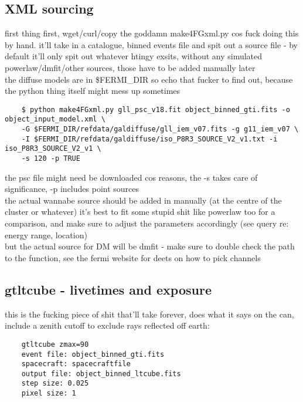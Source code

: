 \documentclass{article}
\begin{document}
\subsection{XML sourcing}%
first thing first, wget/curl/copy the goddamn make4FGxml.py cos fuck doing this by hand. it'll take in a catalogue, binned events file and spit out a source file - by default it'll only spit out whatever htingy exsits, without any simulated powerlaw/dmfit/other sources, those have to be added manually later\\
the diffuse models are in \$FERMI\_DIR so echo that fucker to find out, because the python thing itself might mess up sometimes
\begin{verbatim}
    $ python make4FGxml.py gll_psc_v18.fit object_binned_gti.fits -o object_input_model.xml \
    -G $FERMI_DIR/refdata/galdiffuse/gll_iem_v07.fits -g g11_iem_v07 \
    -I $FERMI_DIR/refdata/galdiffuse/iso_P8R3_SOURCE_V2_v1.txt -i iso_P8R3_SOURCE_V2_v1 \
    -s 120 -p TRUE
\end{verbatim}
the psc file might need be downloaded cos reasons, the -s takes care of significance, -p includes point sources \\
the actual wannabe source should be added in manually (at the centre of the cluster or whatever)
it's best to fit some stupid shit like powerlaw too for a comparison, and make sure to adjust the parameters accordingly (see query re: energy range, location)\\
but the actual source for DM will be dmfit - make sure to double check the path to the function, see the fermi website for deets on how to pick channels
\subsection{gtltcube - livetimes and exposure}%
this is the fucking piece of shit that'll take forever, does what it says on the can, include a zenith cutoff to exclude rays reflected off earth:
\begin{verbatim}
    gtltcube zmax=90
    event file: object_binned_gti.fits
    spacecraft: spacecraftfile
    output file: object_binned_ltcube.fits
    step size: 0.025
    pixel size: 1
\end{verbatim}
\end{document}
